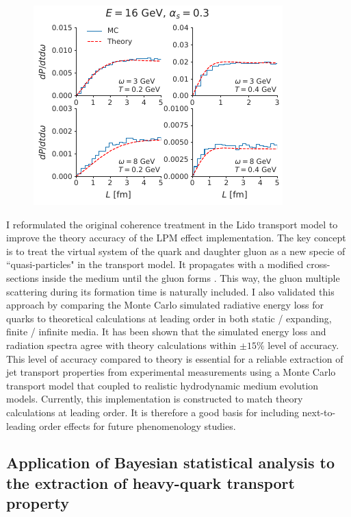 \documentclass[10pt,a4paper]{article}
\begin{document}
\begin{figure}
\begin{center}
\includegraphics[width=.55\textwidth]{spectrum_L.pdf}
\caption{}
\end{center}
\end{figure}



I reformulated the original coherence treatment in the Lido transport model to improve the theory accuracy of the LPM effect implementation.
The key concept is to treat the virtual system of the quark and daughter gluon as a new specie of ``quasi-particles" in the transport model. 
It propagates with a modified cross-sections inside the medium until the gluon forms \cite{Ke:2018jem}. 
This way, the gluon multiple scattering during its formation time is naturally included.
I also validated this approach by comparing the Monte Carlo simulated radiative energy loss for quarks to theoretical calculations at leading order in both static / expanding, finite / infinite media. 
It has been shown that the simulated energy loss and radiation spectra agree with theory calculations within $\pm 15\%$ level of accuracy. 
This level of accuracy compared to theory is essential for a reliable extraction of jet transport properties from experimental measurements using a Monte Carlo transport model that coupled to realistic hydrodynamic medium evolution models.
Currently, this implementation is constructed to match theory calculations at leading order. It is therefore a good basis for including next-to-leading order effects for future phenomenology studies.


\subsection{Application of Bayesian statistical analysis to the extraction of heavy-quark transport property}
\end{document}
